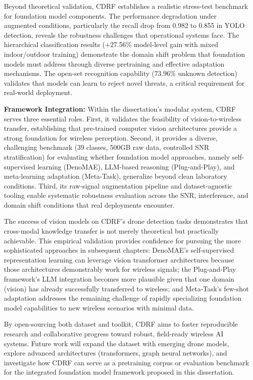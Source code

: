 Beyond theoretical validation, CDRF establishes a realistic stress-test benchmark for foundation model components. The performance degradation under augmented conditions, particularly the recall drop from 0.982 to 0.855 in YOLO detection, reveals the robustness challenges that operational systems face. The hierarchical classification results (+27.56\% model-level gain with mixed indoor/outdoor training) demonstrate the domain shift problem that foundation models must address through diverse pretraining and effective adaptation mechanisms. The open-set recognition capability (73.96\% unknown detection) validates that models can learn to reject novel threats, a critical requirement for real-world deployment.

\textbf{Framework Integration:} Within the dissertation's modular system, CDRF serves three essential roles. First, it validates the feasibility of vision-to-wireless transfer, establishing that pre-trained computer vision architectures provide a strong foundation for wireless perception. Second, it provides a diverse, challenging benchmark (39 classes, 500GB raw data, controlled SNR stratification) for evaluating whether foundation model approaches, namely self-supervised learning (DenoMAE), LLM-based reasoning (Plug-and-Play), and meta-learning adaptation (Meta-Task), generalize beyond clean laboratory conditions. Third, its raw-signal augmentation pipeline and dataset-agnostic tooling enable systematic robustness evaluation across the SNR, interference, and domain shift conditions that real deployments encounter.

The success of vision models on CDRF's drone detection tasks demonstrates that cross-modal knowledge transfer is not merely theoretical but practically achievable. This empirical validation provides confidence for pursuing the more sophisticated approaches in subsequent chapters: DenoMAE's self-supervised representation learning can leverage vision transformer architectures because those architectures demonstrably work for wireless signals; the Plug-and-Play framework's LLM integration becomes more plausible given that one domain (vision) has already successfully transferred to wireless; and Meta-Task's few-shot adaptation addresses the remaining challenge of rapidly specializing foundation model capabilities to new wireless scenarios with minimal data.

By open-sourcing both dataset and toolkit, CDRF aims to foster reproducible research and collaborative progress toward robust, field-ready wireless AI systems. Future work will expand the dataset with emerging drone models, explore advanced architectures (transformers, graph neural networks), and investigate how CDRF can serve as a pretraining corpus or evaluation benchmark for the integrated foundation model framework proposed in this dissertation.
    


